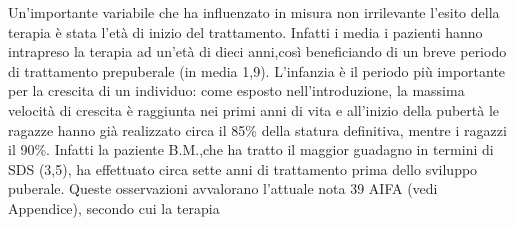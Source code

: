 Un'importante variabile che ha influenzato in misura non irrilevante l'esito della terapia è stata l'età di inizio del trattamento. Infatti i media i pazienti hanno intrapreso la terapia ad un'età di dieci anni,così beneficiando di un breve periodo di trattamento prepuberale (in media 1,9). L'infanzia è il periodo più importante per la crescita di un individuo: come esposto nell'introduzione, la massima velocità di crescita è raggiunta nei primi anni di vita e all'inizio della pubertà le ragazze hanno già realizzato circa il 85\% della statura definitiva, mentre i ragazzi il 90\%. Infatti la paziente B.M.,che ha tratto il maggior guadagno in termini di SDS (3,5), ha effettuato circa sette anni di trattamento prima dello sviluppo puberale. Queste osservazioni avvalorano l'attuale nota 39 AIFA (vedi Appendice), secondo cui la terapia   